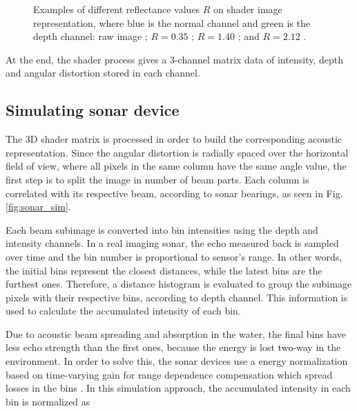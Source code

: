 \documentclass[final,5p,times]{elsarticle}
\begin{document}
\begin{figure}[h]
{        \label{fig:reflectance:2.12}
    }
    \captionsetup{justification=centering}
    \caption{Examples of different reflectance values $R$ on shader image representation, where blue is the normal channel and green is the depth channel: raw image ; $R = 0.35$ ; $R = 1.40$ ; and $R = 2.12$ .}
    \label{fig:sonar_reflectances}
\end{figure}

At the end, the shader process gives a 3-channel matrix data of intensity, depth and angular distortion stored in each channel.


\subsection{Simulating sonar device}
\label{dev:sonardata}

The 3D shader matrix is processed in order to build the corresponding acoustic representation. Since the angular distortion is radially spaced over the horizontal field of view, where all pixels in the same column have the same angle value, the first step is to split the image in number of beam parts. Each column is correlated with its respective beam, according to sonar bearings, as seen in Fig. \ref{fig:sonar_sim}.

Each beam subimage is converted into bin intensities using the depth and intensity channels. In a real imaging sonar, the echo measured back is sampled over time and the bin number is proportional to sensor's range. In other words, the initial bins represent the closest distances, while the latest bins are the furthest ones. Therefore, a distance histogram is evaluated to group the subimage pixels with their respective bins, according to depth channel. This information is used to calculate the accumulated intensity of each bin.

Due to acoustic beam spreading and absorption in the water, the final bins have less echo strength than the first ones, because the energy is lost two-way in the environment. In order to solve this, the sonar devices use a energy normalization based on time-varying gain for range dependence compensation which spread losses in the bins \cite{urick2013}. In this simulation approach, the accumulated intensity in each bin is normalized as
\end{document}
